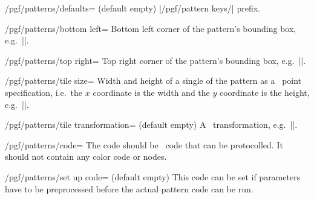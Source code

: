 \begin{command}{\pgfdeclarepattern{}}
\begin{key}{/pgf/patterns/defaults= (default \normalfont empty)}
        |/pgf/pattern keys/| prefix.
    \end{key}
    \begin{key}{/pgf/patterns/bottom left=}
        Bottom left corner of the pattern's bounding box, e.g.\
        |\pgfqpoint{-.1pt}{-.1pt}|.
    \end{key}
    \begin{key}{/pgf/patterns/top right=}
        Top right corner of the pattern's bounding box, e.g.\
        |\pgfqpoint{3.1pt}{3.1pt}|.
    \end{key}
    \begin{key}{/pgf/patterns/tile size=}
        Width and height of a single of the pattern as a \pgfname\ point
        specification, i.e.\ the $x$ coordinate is the width and the $y$
        coordinate is the height, e.g.\ |\pgfqpoint{3pt}{3pt}|.
    \end{key}
    \begin{key}{/pgf/patterns/tile transformation= (default \normalfont empty)}
        A \pgfname\ transformation, e.g.\ ||.
    \end{key}
    \begin{key}{/pgf/patterns/code=}
        The code should be \pgfname\ code that can be protocolled. It should not
        contain any color code or nodes.
    \end{key}
    \begin{key}{/pgf/patterns/set up code= (default \normalfont empty)}
        This code can be set if parameters have to be preprocessed before the
        actual pattern code can be run.
    \end{key}
\end{command}

